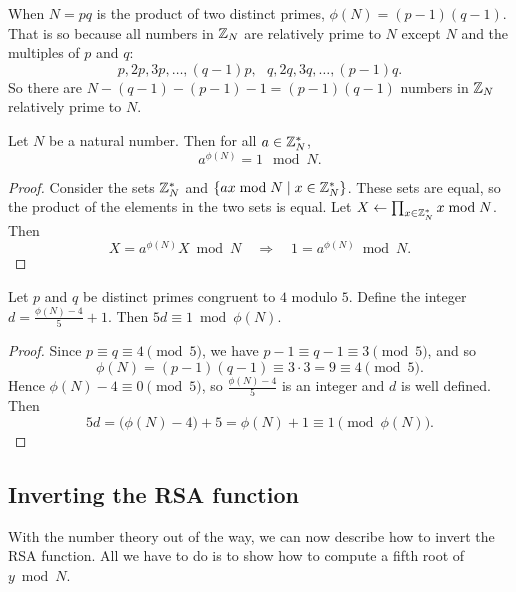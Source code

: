 When $N=pq$ is the product of two distinct primes, $\phi(N) = (p-1)(q-1)$.
That is so because all numbers in $\mathbb{Z}_N$ are relatively prime to $N$ except
$N$ and the multiples of $p$ and $q$:
\[ p, 2p, 3p, \dots, (q-1)p,\ \ \ q, 2q, 3q, \dots, (p-1)q.\]
So there are $N - (q-1) - (p-1) - 1 = (p-1)(q-1)$ numbers
in $\mathbb{Z}_N$ relatively prime to $N$.

\begin{theorem}\label{thm:euler}
Let $N$ be a natural number. Then for all $a \in \mathbb{Z}^*_N$,
\[ a^{\phi(N)} = 1 \mod N.\]
\end{theorem}
\begin{proof}
Consider the sets $\mathbb{Z}^*_N$ and $\{ax \bmod N \mid x \in \mathbb{Z}^*_N\}$.
These sets are equal, so the product of the elements in the two
sets is equal.
Let $X \gets \prod_{x \in \mathbb{Z}^*_N} x \bmod N$.
Then 
\[ X = a^{\phi(N)}X \bmod N \quad \Rightarrow\quad 1 = a^{\phi(N)} \bmod N.\]
\end{proof}



\begin{theorem}\label{lemma:inv}
Let $p$ and $q$ be distinct primes congruent to $4$ modulo $5$.
Define the integer $d = \frac{\phi(N) - 4}{5} + 1$.
Then $5d \equiv 1 \bmod \phi(N)$.
\end{theorem}

\begin{proof}
  Since $p \equiv q \equiv 4 \pmod 5$, we have $p - 1 \equiv q - 1 \equiv
  3 \pmod 5$, and so
  \[ \phi(N) = (p-1)(q-1) \equiv 3 \cdot 3 = 9 \equiv 4 \pmod 5. \]
  Hence $\phi(N) - 4 \equiv 0 \pmod 5$, so $\frac{\phi(N)-4}{5}$ is an
  integer and $d$ is well defined.  Then
  \[ 5d = \big(\phi(N) - 4\big) + 5 = \phi(N) + 1 \equiv 1 \pmod{\phi(N)}. \]
\end{proof}



\subsection{Inverting the RSA function}

With the number theory out of the way, we can now describe how
to invert the RSA function.
All we have to do is to show how to compute a fifth root of $y \bmod N$.

